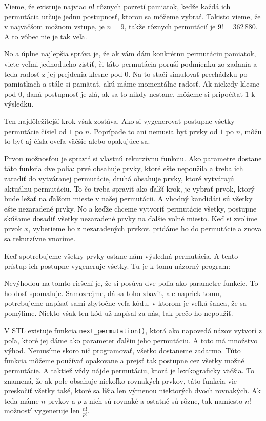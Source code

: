 Vieme, že existuje najviac $n!$ rôznych pozretí pamiatok, keďže každá ich permutácia určuje jednu
postupnosť, ktorou sa môžeme vybrať. Takisto vieme, že v najväčšom možnom vstupe, je $n=9$, takže
rôznych permutácií je $9!=362\,880$. A to vôbec nie je tak veľa.

No a úplne najlepšia správa je, že ak vám dám konkrétnu permutáciu pamiatok, viete veľmi jednoducho
zistiť, či táto permutácia poruší podmienku zo zadania a teda radosť z jej prejdenia klesne pod $0$.
Na to stačí simulovať prechádzku po pamiatkach a stále si pamätať, akú máme momentálne radosť. Ak
niekedy klesne pod $0$, daná postupnosť je zlá, ak sa to nikdy nestane, môžeme si pripočítať $1$ k
výsledku.

Ten najdôležitejší krok však zostáva. Ako si vygenerovať postupne všetky permutácie čísiel od $1$ po
$n$. Poprípade to ani nemusia byť prvky od $1$ po $n$, môžu to byť aj čísla oveľa väčšie alebo
opakujúce sa.

\medskip

Prvou možnosťou je spraviť si vlastnú rekurzívnu funkciu. Ako parametre dostane táto funkcia dve
polia: prvé obsahuje prvky, ktoré ešte nepoužila a treba ich zaradiť do vytváranej permutácie, druhá
obsahuje prvky, ktoré vytvárajú aktuálnu permutáciu. To čo treba spraviť ako ďalší krok, je vybrať
prvok, ktorý bude ležať na ďalšom mieste v našej permutácii. A vhodný kandidáti sú všetky ešte
nezaradené prvky. No a keďže chceme vytvoriť permutácie všetky, postupne skúšame dosadiť všetky
nezaradené prvky na ďalšie voľné miesto. Keď si zvolíme prvok $x$, vyberieme ho z nezaradených prvkov,
pridáme ho do permutácie a znova sa rekurzívne vnoríme.

Keď spotrebujeme všetky prvky ostane nám výsledná permutácia. A tento prístup ich postupne
vygeneruje všetky. Tu je k tomu názorný program:


Nevýhodou na tomto riešení je, že si posúva dve polia ako parametre funkcie. To ho dosť spomaľuje.
Samozrejme, dá sa toho zbaviť, ale napriek tomu, potrebujeme napísať sami zbytočne veľa kódu, v
ktorom je veľká šanca, že sa pomýlime. Niekto však ten kód už napísal za nás, tak prečo ho nepoužiť.

V STL existuje funkcia \texttt{next\_permutation()}, ktorá ako napovedá názov vytvorí z poľa, ktoré
jej dáme ako parameter ďalšiu jeho permutáciu. A toto má množstvo výhod. Nemusíme skoro nič
programovať, všetko dostaneme zadarmo. Túto funkcia môžeme používať opakovane a prejsť tak postupne
cez všetky možné permutácie. A taktiež vždy nájde permutáciu, ktorá je lexikograficky väčšia. To
znamená, že ak pole obsahuje niekoľko rovnakých prvkov, táto funkcia vie preskočiť všetky také,
ktoré sa líšia len výmenou niektorých dvoch rovnakých. Ak teda máme $n$ prvkov a $p$ z nich sú
rovnaké a ostatné sú rôzne, tak namiesto $n!$ možností vygeneruje len $\frac{n!}{p!}$.

